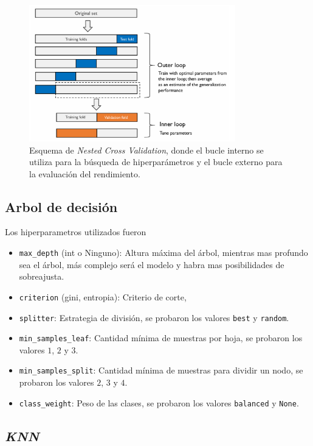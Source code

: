 \documentclass[12pt,a4paper]{article}
\begin{document}
\begin{figure}[H]
    \centering
    \includegraphics[width=0.8\textwidth]{Imagenes/nested-kfold-cv.png}
    \caption{Esquema de \textit{Nested Cross Validation}, donde el bucle interno se utiliza para la búsqueda de hiperparámetros y el bucle externo para la evaluación del rendimiento.}
    \label{fig:nested_cross_validation}
\end{figure}

\subsection{Arbol de decisión}
Los hiperparametros utilizados fueron

\begin{itemize}
    \item \texttt{max\_depth} (int o Ninguno): Altura máxima del árbol, mientras mas profundo sea el árbol, más complejo será el modelo y habra mas posibilidades de sobreajusta.
    \item \texttt{criterion} ({gini, entropia}): Criterio de corte,
    \item \texttt{splitter}: Estrategia de división, se probaron los valores \texttt{best} y \texttt{random}.
    \item \texttt{min\_samples\_leaf}: Cantidad mínima de muestras por hoja, se probaron los valores $1$, $2$ y $3$.
    \item \texttt{min\_samples\_split}: Cantidad mínima de muestras para dividir un nodo, se probaron los valores $2$, $3$ y $4$.
    \item \texttt{class\_weight}: Peso de las clases, se probaron los valores \texttt{balanced} y \texttt{None}.
\end{itemize}
\subsection{\textit{KNN}}
\end{document}
